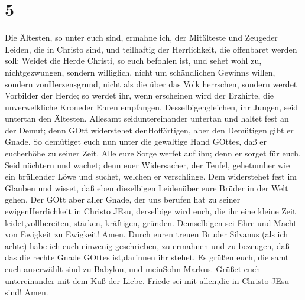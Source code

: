\hypertarget{section-4}{%
\section{5}\label{section-4}}

 Die Ältesten, so unter euch sind, ermahne ich, der
Mitälteste und Zeugeder Leiden, die in Christo sind, und teilhaftig der
Herrlichkeit, die offenbaret werden soll:  Weidet die Herde
Christi, so euch befohlen ist, und sehet wohl zu, nichtgezwungen,
sondern williglich, nicht um schändlichen Gewinns willen, sondern
vonHerzensgrund,  nicht als die über das Volk herrschen,
sondern werdet Vorbilder der Herde;  so werdet ihr, wenn
erscheinen wird der Erzhirte, die unverwelkliche Kroneder Ehren
empfangen.  Desselbigengleichen, ihr Jungen, seid untertan
den Ältesten. Allesamt seiduntereinander untertan und haltet fest an der
Demut; denn GOtt widerstehet denHoffärtigen, aber den Demütigen gibt er
Gnade.  So demütiget euch nun unter die gewaltige Hand
GOttes, daß er eucherhöhe zu seiner Zeit.  Alle eure Sorge
werfet auf ihn; denn er sorget für euch.  Seid nüchtern und
wachet; denn euer Widersacher, der Teufel, gehetumher wie ein brüllender
Löwe und suchet, welchen er verschlinge.  Dem widerstehet
fest im Glauben und wisset, daß eben dieselbigen Leidenüber eure Brüder
in der Welt gehen.  Der GOtt aber aller Gnade, der uns
berufen hat zu seiner ewigenHerrlichkeit in Christo JEsu, derselbige
wird euch, die ihr eine kleine Zeit leidet,vollbereiten, stärken,
kräftigen, gründen.  Demselbigen sei Ehre und Macht von
Ewigkeit zu Ewigkeit! Amen.  Durch euren treuen Bruder
Silvanus (als ich achte) habe ich euch einwenig geschrieben, zu ermahnen
und zu bezeugen, daß das die rechte Gnade GOttes ist,darinnen ihr
stehet.  Es grüßen euch, die samt euch auserwählt sind zu
Babylon, und meinSohn Markus.  Grüßet euch untereinander
mit dem Kuß der Liebe. Friede sei mit allen,die in Christo JEsu sind!
Amen.
